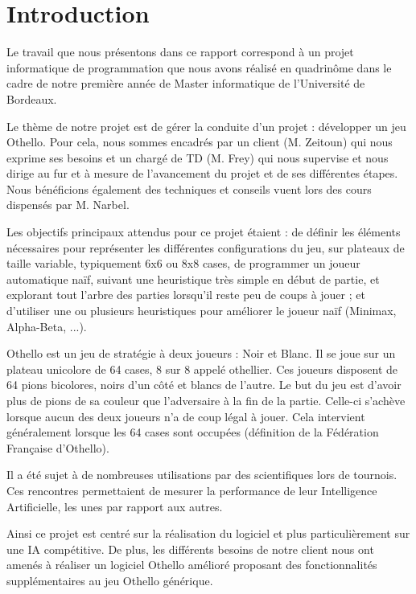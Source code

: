 \documentclass[a4paper,12pt]{report}
\begin{document}
\begingroup
\hypersetup{linkcolor=black}
\tableofcontents
\endgroup

\hypersetup{linkcolor=blue}

\chapter*{Introduction}

Le travail que nous présentons dans ce rapport correspond à un projet informatique de programmation que nous avons réalisé en quadrinôme dans le cadre de notre première année de Master informatique de l’Université de Bordeaux.

Le thème de notre projet est de gérer la conduite d’un projet : développer un jeu Othello. Pour cela, nous sommes encadrés par un client (M. Zeitoun) qui nous exprime ses besoins et un chargé de TD (M. Frey) qui nous supervise et nous dirige au fur et à mesure de l’avancement du projet et de ses différentes étapes. Nous bénéficions également des techniques et conseils vuent lors des cours dispensés par M. Narbel.

Les objectifs principaux attendus pour ce projet étaient : de définir les éléments nécessaires pour représenter les différentes configurations du jeu, sur plateaux de taille variable, typiquement 6x6 ou 8x8 cases, de programmer un joueur automatique naïf, suivant une heuristique très simple en début de partie, et explorant tout l'arbre des parties lorsqu'il reste peu de coups à jouer ; et d’utiliser une ou plusieurs heuristiques pour améliorer le joueur naïf (Minimax, Alpha-Beta, ...).

Othello est un jeu de stratégie à deux joueurs : Noir et Blanc. Il se joue sur un plateau unicolore de 64 cases, 8 sur 8 appelé othellier. Ces joueurs disposent de 64 pions bicolores, noirs d’un côté et blancs de l’autre. Le but du jeu est d’avoir plus de pions de sa couleur que l’adversaire à la fin de la partie. Celle-ci s’achève lorsque aucun des deux joueurs n’a de coup légal à jouer. Cela intervient généralement lorsque les 64 cases sont occupées (définition de la Fédération Française d’Othello).

Il a été sujet à de nombreuses utilisations par des scientifiques lors de tournois. Ces rencontres permettaient de mesurer la performance de leur Intelligence Artificielle, les unes par rapport aux autres.

Ainsi ce projet est centré
sur la réalisation du logiciel et plus particulièrement sur une IA compétitive. De plus, les différents besoins de notre client nous ont amenés à réaliser un logiciel Othello amélioré proposant des fonctionnalités supplémentaires au jeu Othello générique.
\end{document}
